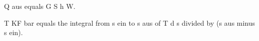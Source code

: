 Q aus equals G S h W.  

T KF bar equals the integral from s ein to s aus of T d s divided by (s aus minus s ein).